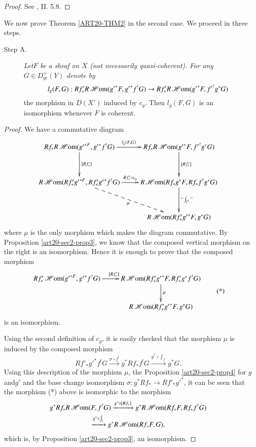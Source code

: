 \begin{proof}
See \cite{art20-key1}, II. 5.8.
\end{proof}

We now prove Theorem \ref{ART20-THM2} in the second case. We proceed in three steps.
\begin{description}
\item[Step A.] {\em Let\pageoriginale $F$ be a sheaf on $X$ (not necessarily quasi-coherent). For any $G\in D^{+}_{qc}(Y)$ denote by}
{\fontsize{10pt}{12pt}\selectfont
$$
l_{g}(F,G):Rf'_{*}R\operatorname{\mathscr{H}\mathrm{om}}({g'}^{*}F,{g'}^{*}f^{!}G)\to Rf'_{*}R\operatorname{\mathscr{H}\mathrm{om}}({g'}^{*}F, {f'}^{!}g^{*}G)
$$}\relax
the morphism in $D(X')$ induced by $c_{g}$. Then $l_{g}(F,G)$ is an isomorphism whenever $F$ is coherent.
\end{description}

\begin{proof}
We have a commutative diagram
\[
\xymatrix@R=1.2cm{
Rf_{*}R\scrHom({g'}^{*F},{g'}^{*}f^{!}G)\ar[d]^-{[Rf'_{*}]}\ar[r]^-{l_{g}(F,G)} & Rf_{*}R\scrHom({g'}^{*}F,{f'}^{!}g^{*}G)\ar[d]^-{[Rf'_{*}]}\\
R\scrHom(Rf'_{*}{g'}^{*F},Rf'_{*}{g'}^{*}f^{!}G)\ar[r]^-{Rf'_{*}\circ c_{g}}\ar@{-->}[dr]_-{\mu} & R\scrHom(Rf_{*}g^{*}F,Rf_{*}f^{!}g^{*}G)\ar[d]^-{\text{``}\int_{f'}\text{''}}\\
 & R\scrHom(Rf'_{*}{g'}^{*}F,g^{*}G)
}
\]
where $\mu$ is the only morphism which makes the diagram commutative. By Proposition \ref{art20-sec2-prop3}, we know that the composed vertical morphism on the right is an isomorphism. Hence it is enough to prove that the composed morphism
\begin{equation*}
\vcenter{\xymatrix{
Rf'_{*}\scrHom({g'}^{*F},{g'}^{*}f^{!}G)\ar[r]^{[Rf'_{*}]} & R\scrHom(Rf'_{*}{g'}^{*}F,Rf'_{*}g^{*}f^{!}G)\ar[d]^-{\mu}\\
 & R\scrHom(Rf'_{*}{g'}^{*}F, g^{*}G)
}}\tag{*}
\end{equation*}
is an isomorphism.

Using the second definition of $c_{g}$, it is easily checked that the morphism $\mu$ is induced by the composed morphism
$$
Rf'_{*}{g'}^{*}f^{!}G\xrightarrow{\sigma\circ f^{!}}g^{*}Rf_{*}f^{!}G\xrightarrow{g^{*}\circ \int_{f}}g^{*}G.
$$
Using this description of the morphism $\mu$, the Proposition \ref{art20-sec2-prop4} for $g$ and\pageoriginale $g'$ and the base change isomorphism $\sigma:g^{*}Rf_{*}\to Rf'_{*}{g'}^{*}$, it can be seen that the morphism (*) above is isomorphic to the morphism 
\begin{gather*}
g^{*}Rf_{*}R\operatorname{\mathscr{H}\mathrm{om}}(F,f^{!}G)\xrightarrow{g^{*}\circ [Rf_{*}]}g^{*}R\operatorname{\mathscr{H}\mathrm{om}}(Rf_{*}F,Rf_{*}f^{!}G)\\
\xrightarrow{g^{*}\circ \int_{f}}g^{*}R\operatorname{\mathscr{H}\mathrm{om}}(Rf_{*}F,G),
\end{gather*}
which is, by Proposition \ref{art20-sec2-prop3}, an isomorphism.
\end{proof}

